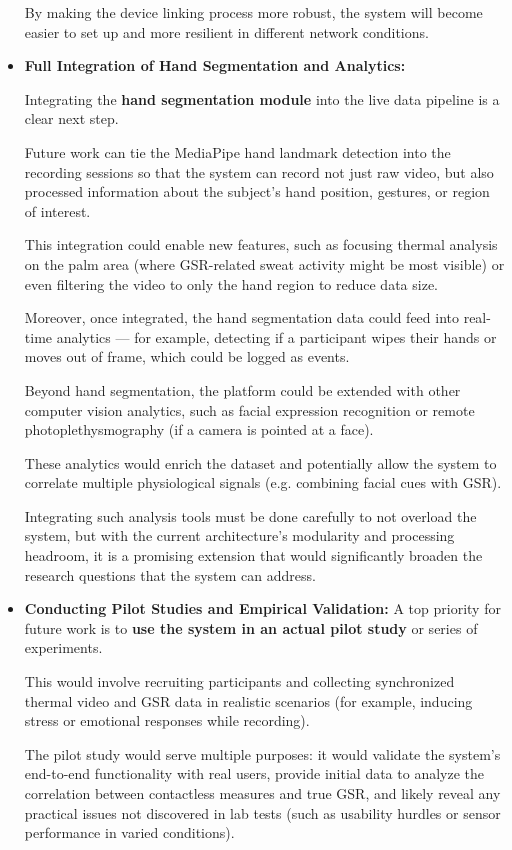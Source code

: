 \begin{itemize}
By making the device linking process more robust, the system will become easier to
set up and more resilient in different network conditions.

\item \textbf{Full Integration of Hand Segmentation and Analytics:}

Integrating the \textbf{hand segmentation module}
 into the live data pipeline is a clear next step.

Future work can tie the MediaPipe hand landmark detection into the recording sessions
so that the system can record not just raw video, but also processed information
about the subject's hand position, gestures, or region of interest.

This integration could enable new features, such as focusing thermal analysis on the
palm area (where GSR-related sweat activity might be most visible) or even filtering
the video to only the hand region to reduce data size.

Moreover, once integrated, the hand segmentation data could feed into real-time
analytics --- for example, detecting if a participant wipes their hands or moves out
of frame, which could be logged as events.

Beyond hand segmentation, the platform could be extended with other computer vision
analytics, such as facial expression recognition or remote photoplethysmography (if a
camera is pointed at a face).

These analytics would enrich the dataset and potentially allow the system to
correlate multiple physiological signals (e.g.  combining facial cues with GSR).

Integrating such analysis tools must be done carefully to not overload the
system, but with the current architecture's modularity and processing headroom, it is
a promising extension that would significantly broaden the research questions that
the system can address.

\item \textbf{Conducting Pilot Studies and Empirical Validation:}
 A top priority for future work is to \textbf{use the system in an actual pilot study}
 or series of experiments.

This would involve recruiting participants and collecting synchronized thermal video
and GSR data in realistic scenarios (for example, inducing stress or emotional
responses while recording).

The pilot study would serve multiple purposes: it would validate the system's
end-to-end functionality with real users, provide initial data to analyze the
correlation between contactless measures and true GSR, and likely reveal any
practical issues not discovered in lab tests (such as usability hurdles or sensor
performance in varied conditions).


\end{itemize}

